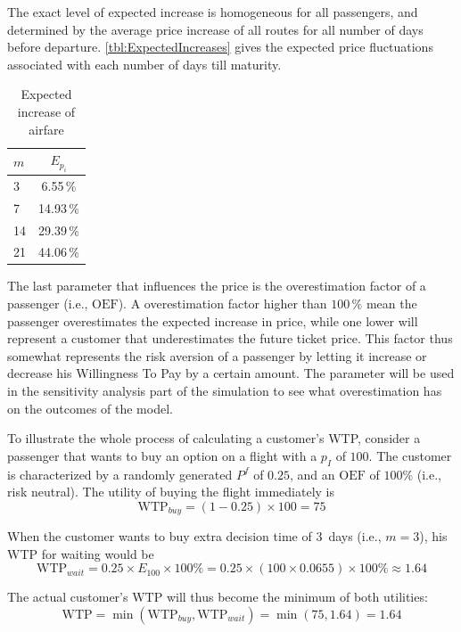 The exact level of expected increase is homogeneous for all passengers, and determined by the average price increase of all routes for all number of days before departure. \autoref{tbl:ExpectedIncreases} gives the expected price fluctuations associated with each number of days till maturity.


\begin{table}
\centering
\footnotesize
\begin{tabular}{l c}
    \toprule
    $m$       &  $E_{p_i}$ \\
    \midrule
    3         &   6.55\,\%  \\
    7         &  14.93\,\% \\
    14        &  29.39\,\% \\
    21        &  44.06\,\% \\
    \bottomrule
\end{tabular}
\caption{Expected increase of airfare}
\label{tbl:ExpectedIncreases}
\end{table}


The last parameter that influences the price is the overestimation factor of a passenger (i.e., $\mbox{OEF}$). A overestimation factor higher than $100\,\%$ mean the passenger overestimates the expected increase in price, while one lower will represent a customer that underestimates the future ticket price. This factor thus somewhat represents the risk aversion of a passenger by letting it increase or decrease his Willingness To Pay by a certain amount. The parameter will be used in the sensitivity analysis part of the simulation to see what overestimation has on the outcomes of the model.


To illustrate the whole process of calculating a customer's WTP, consider a passenger that wants to buy an option on a flight with a $p_I$ of $100$. The customer is characterized by a randomly generated $P^f$ of $0.25$, and an $\mbox{OEF}$ of $100\%$ (i.e., risk neutral). The utility of buying the flight immediately is 
$$\mbox{WTP}_{buy} = (1 - 0.25) \times 100 = 75$$

When the customer wants to buy extra decision time of 3~days (i.e., $m = 3$), his WTP for waiting would be
$$\mbox{WTP}_{wait} = 0.25 \times E_{100} \times 100\% = 0.25 \times (100 \times 0.0655) \times 100\% \approx 1.64$$

The actual customer's $\mbox{WTP}$ will thus become the minimum of both utilities:
$$\mbox{WTP} = \min(\mbox{WTP}_{buy}, \mbox{WTP}_{wait}) = \min(75, 1.64) = 1.64$$



